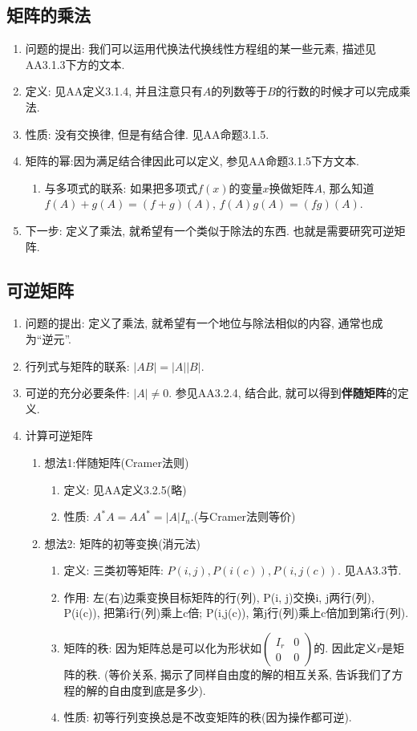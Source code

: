 \subsection*{矩阵的乘法}
\begin{enumerate}
\item 问题的提出: 我们可以运用代换法代换线性方程组的某一些元素, 描述见AA3.1.3下方的文本.
\item 定义: 见AA定义3.1.4, 并且注意只有$A$的列数等于$B$的行数的时候才可以完成乘法.
\item 性质: 没有交换律, 但是有结合律. 见AA命题3.1.5.
\item 矩阵的幂:因为满足结合律因此可以定义, 参见AA命题3.1.5下方文本.
\begin{enumerate}
\item 与多项式的联系: 如果把多项式$f(x)$的变量$x$换做矩阵$A$, 那么知道$f(A)+g(A)=(f+g)(A)$,
$f(A)g(A)=(fg)(A)$.
\end{enumerate}
\item 下一步: 定义了乘法, 就希望有一个类似于除法的东西. 也就是需要研究可逆矩阵. 
\end{enumerate}

\subsection*{可逆矩阵}
\begin{enumerate}
\item 问题的提出: 定义了乘法, 就希望有一个地位与除法相似的内容, 通常也成为``逆元''. 
\item 行列式与矩阵的联系: $|AB|=|A||B|$.
\item 可逆的充分必要条件: $|A|\neq0$. 参见AA3.2.4, 结合此, 就可以得到\textbf{伴随矩阵}的定义.
\item 计算可逆矩阵
\begin{enumerate}
\item 想法1:伴随矩阵(Cramer法则)
\begin{enumerate}
\item 定义: 见AA定义3.2.5(略)
\item 性质: $A^{*}A=AA^{*}=|A|I_{n}.$(与Cramer法则等价)
\end{enumerate}
\item 想法2: 矩阵的初等变换(消元法)
\begin{enumerate}
\item 定义: 三类初等矩阵: $P(i,j),$$P(i(c)),P(i,j(c))$. 见AA3.3节. 
\item 作用: 左(右)边乘变换目标矩阵的行(列), P(i, j)交换i, j两行(列), P(i(c)), 把第i行(列)乘上c倍; P(i,j(c)),
第j行(列)乘上c倍加到第i行(列).
\item 矩阵的秩: 因为矩阵总是可以化为形状如$\begin{pmatrix}I_{r} & 0\\
0 & 0
\end{pmatrix}$的. 因此定义$r$是矩阵的秩. (等价关系, 揭示了同样自由度的解的相互关系, 告诉我们了方程的解的自由度到底是多少).
\item 性质: 初等行列变换总是不改变矩阵的秩(因为操作都可逆).
\end{enumerate}
\end{enumerate}
\end{enumerate}


